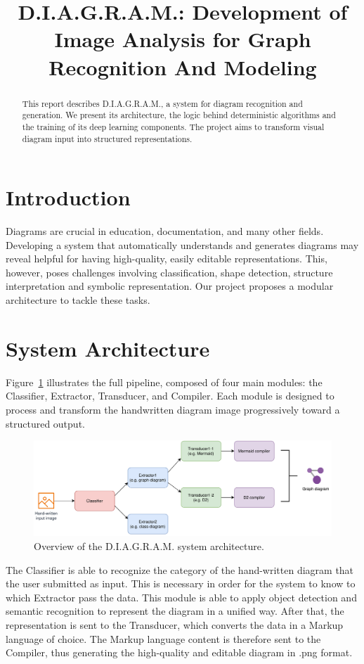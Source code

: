 \documentclass[conference]{IEEEtran}
\title{D.I.A.G.R.A.M.: Development of Image Analysis for Graph Recognition And Modeling}
\author{
    \IEEEauthorblockN{Filippo Garagnani, Saverio Napolitano, Nicola Ricciardi}
    \IEEEauthorblockA{
        'Computer Vision and Cognitive System' course \\
        \textit{Università di Modena e Reggio Emilia}
    }
}
\begin{document}
\maketitle

\begin{abstract}
This report describes D.I.A.G.R.A.M., a system for diagram recognition and generation. We present its architecture, the logic behind deterministic algorithms and the training of its deep learning components. The project aims to transform visual diagram input into structured representations.
\end{abstract}

\section{Introduction}
Diagrams are crucial in education, documentation, and many other fields. Developing a system that automatically understands and generates diagrams may reveal helpful for having high-quality, easily editable representations. This, however, poses challenges involving classification, shape detection, structure interpretation and symbolic representation. Our project proposes a modular architecture to tackle these tasks.

\section{System Architecture}
Figure~\ref{fig:pipeline} illustrates the full pipeline, composed of four main modules: the Classifier, Extractor, Transducer, and Compiler. Each module is designed to process and transform the handwritten diagram image progressively toward a structured output.

\begin{figure}[H]
\centering
\includegraphics[width=\linewidth]{overview.png}
\caption{Overview of the D.I.A.G.R.A.M. system architecture.}
\label{fig:pipeline}
\end{figure}

The Classifier is able to recognize the category of the hand-written diagram that the user submitted as input. This is necessary in order for the system to know to which Extractor pass the data. This module is able to apply object detection and semantic recognition to represent the diagram in a unified way. After that, the representation is sent to the Transducer, which converts the data in a Markup language of choice. The Markup language content is therefore sent to the Compiler, thus generating the high-quality and editable diagram in .png format.
\end{document}
